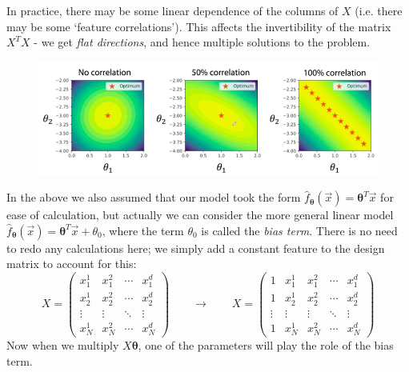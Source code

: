 In practice, there may be some linear dependence of the columns of $X$ (i.e. there may be some `feature correlations'). This affects the invertibility of the matrix $X^TX$ - we get \textit{flat directions}, and hence multiple solutions to the problem.

\begin{figure}[H]
\centering
\includegraphics[scale=0.3]{featurecorrelations.png}
\end{figure}


\newpage
In the above we also assumed that our model took the form $\hat{f}_{\pmb{\theta}}(\vec{x}) = \pmb{\theta}^T \vec{x}$ for ease of calculation, but actually we can consider the more general linear model $\hat{f}_{\pmb{\theta}}(\vec{x}) = \pmb{\theta}^T \vec{x} + \theta_0$, where the term $\theta_0$ is called the \textit{bias term}. There is no need to redo any calculations here; we simply add a constant feature to the design matrix to account for this:
\begin{equation*}
X = \begin{pmatrix} x_1^1 & x_1^2 & \cdots & x_1^d \\ x_2^1 & x_2^2 & \cdots & x_2^d \\ \vdots & \vdots & \ddots & \vdots \\ x_N^1 & x_N^2 & \cdots & x_N^d \end{pmatrix} \qquad \rightarrow \qquad X =\begin{pmatrix} 1 & x_1^1 & x_1^2 & \cdots & x_1^d \\ 1 & x_2^1 & x_2^2 & \cdots & x_2^d \\ \vdots & \vdots & \vdots & \ddots & \vdots \\ 1 & x_N^1 & x_N^2 & \cdots & x_N^d \end{pmatrix}
\end{equation*}
Now when we multiply $X\pmb{\theta}$, one of the parameters will play the role of the bias term.

